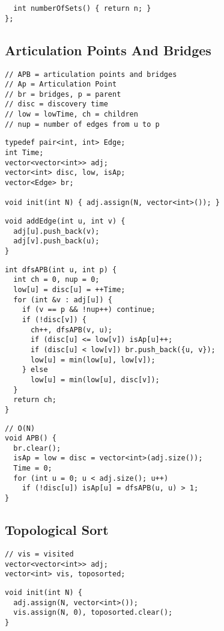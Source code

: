 \documentclass[twoside]{article}
\begin{document}
\begin{multicols*}{2}
\begin{verbatim}
  int numberOfSets() { return n; }
};
\end{verbatim}

\subsectionfont{\large\bfseries\sffamily\underline}
\subsection*{Articulation Points And Bridges}
\begin{verbatim}
// APB = articulation points and bridges
// Ap = Articulation Point
// br = bridges, p = parent
// disc = discovery time
// low = lowTime, ch = children
// nup = number of edges from u to p
\end{verbatim}
\vspace{-12pt}
\begin{verbatim}
typedef pair<int, int> Edge;
int Time;
vector<vector<int>> adj;
vector<int> disc, low, isAp;
vector<Edge> br;

void init(int N) { adj.assign(N, vector<int>()); }
\end{verbatim}
\vspace{-12pt}
\begin{verbatim}
void addEdge(int u, int v) {
  adj[u].push_back(v);
  adj[v].push_back(u);
}
\end{verbatim}
\vspace{-12pt}
\begin{verbatim}
int dfsAPB(int u, int p) {
  int ch = 0, nup = 0;
  low[u] = disc[u] = ++Time;
  for (int &v : adj[u]) {
    if (v == p && !nup++) continue;
    if (!disc[v]) {
      ch++, dfsAPB(v, u);
      if (disc[u] <= low[v]) isAp[u]++;
      if (disc[u] < low[v]) br.push_back({u, v});
      low[u] = min(low[u], low[v]);
    } else
      low[u] = min(low[u], disc[v]);
  }
  return ch;
}
\end{verbatim}
\vspace{-12pt}
\begin{verbatim}
// O(N)
void APB() {
  br.clear();
  isAp = low = disc = vector<int>(adj.size());
  Time = 0;
  for (int u = 0; u < adj.size(); u++)
    if (!disc[u]) isAp[u] = dfsAPB(u, u) > 1;
}
\end{verbatim}

\subsectionfont{\large\bfseries\sffamily\underline}
\subsection*{Topological Sort}
\begin{verbatim}
// vis = visited
vector<vector<int>> adj;
vector<int> vis, toposorted;
\end{verbatim}
\vspace{-12pt}
\begin{verbatim}
void init(int N) {
  adj.assign(N, vector<int>());
  vis.assign(N, 0), toposorted.clear();
}


\end{verbatim}
\end{multicols*}
\end{document}
